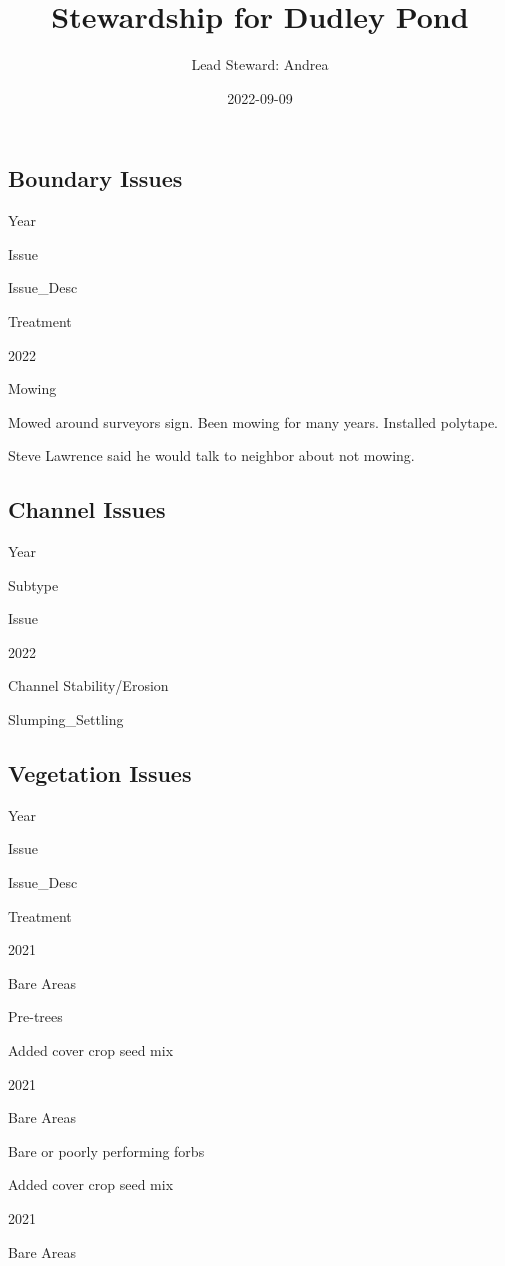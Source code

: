 \documentclass[
  landscape]{article}
\title{Stewardship for Dudley Pond}
\author{Lead Steward: Andrea}
\date{2022-09-09}
\begin{document}
\maketitle

\hypertarget{boundary-issues}{%
\subsection{Boundary Issues}\label{boundary-issues}}

Year

Issue

Issue\_Desc

Treatment

2022

Mowing

Mowed around surveyors sign. Been mowing for many years. Installed
polytape.

Steve Lawrence said he would talk to neighbor about not mowing.

\hypertarget{channel-issues}{%
\subsection{Channel Issues}\label{channel-issues}}

Year

Subtype

Issue

2022

Channel Stability/Erosion

Slumping\_Settling

\hypertarget{vegetation-issues}{%
\subsection{Vegetation Issues}\label{vegetation-issues}}

Year

Issue

Issue\_Desc

Treatment

2021

Bare Areas

Pre-trees

Added cover crop seed mix

2021

Bare Areas

Bare or poorly performing forbs

Added cover crop seed mix

2021

Bare Areas
\end{document}
